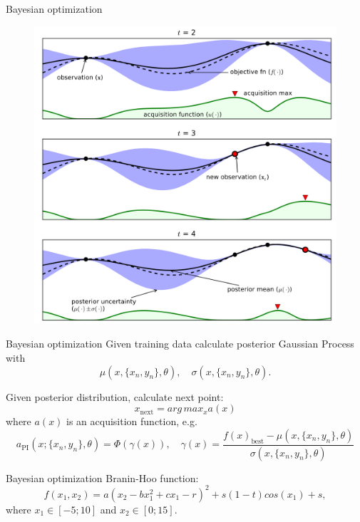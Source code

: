 \documentclass[12pt]{beamer}
\begin{document}
\begin{frame}{Bayesian optimization}
\begin{figure}
\includegraphics[scale=0.35]{Bayes_optimization.png} 
\end{figure}
\end{frame}

\begin{frame}{Bayesian optimization}
Given training data calculate posterior Gaussian Process with 
$$
\mu(x,\{x_n,y_n\},\theta), \quad \sigma(x,\{x_n,y_n\},\theta).
$$

Given posterior distribution, calculate next point:
$$
x_{\text{next}}=arg\,max_{x}a(x)
$$
where $a(x)$ is an acquisition function, e.g.
$$
a_{\text{PI}}(x;\{x_n,y_n\}, \theta)=\Phi(\gamma(x)),\quad \gamma(x)=\frac{f(x)_{\text{best}} - \mu(x,\{x_n,y_n\},\theta)}{\sigma(x,\{x_n,y_n\},\theta)}
$$
\end{frame}


\begin{frame}{Bayesian optimization}
Branin-Hoo function:
$$
f(x_1,x_2) = a(x_2-bx_1^2+cx_1 - r)^2 +s (1-t)cos(x_1)+s,
$$
where $x_1\in [-5;10]$ and $x_2\in [0;15]$.
\end{frame}
\end{document}
